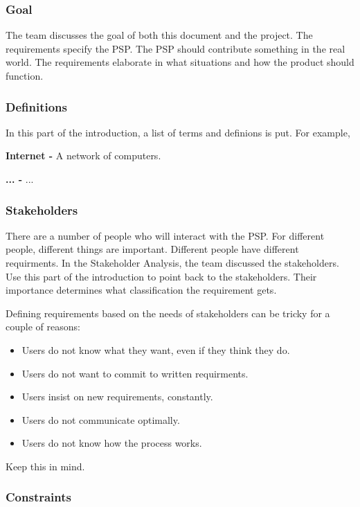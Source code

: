 \documentclass[10pt]{report}
\begin{document}
\subsubsection{Goal}

The team discusses the goal of both this document and the project. The requirements specify the PSP. The PSP should contribute something in the real world. The requirements elaborate in what situations and how the product should function.

\subsubsection{Definitions}

In this part of the introduction, a list of terms and definions is put. For example,

\textbf{Internet - } A network of computers.

\textbf{... - } ...

\subsubsection{Stakeholders}

There are a number of people who will interact with the PSP. For different people, different things are important. Different people have different requirments. In the Stakeholder Analysis, the team discussed the stakeholders. Use this part of the introduction to point back to the stakeholders. Their importance determines what classification the requirement gets.

Defining requirements based on the needs of stakeholders can be tricky for a couple of reasons:

\begin{itemize}
	\item Users do not know what they want, even if they think they do.
	\item Users do not want to commit to written requirments.
	\item Users insist on new requirements, constantly.
	\item Users do not communicate optimally.
	\item Users do not know how the process works.
\end{itemize}

Keep this in mind.

\subsubsection{Constraints}
\end{document}
